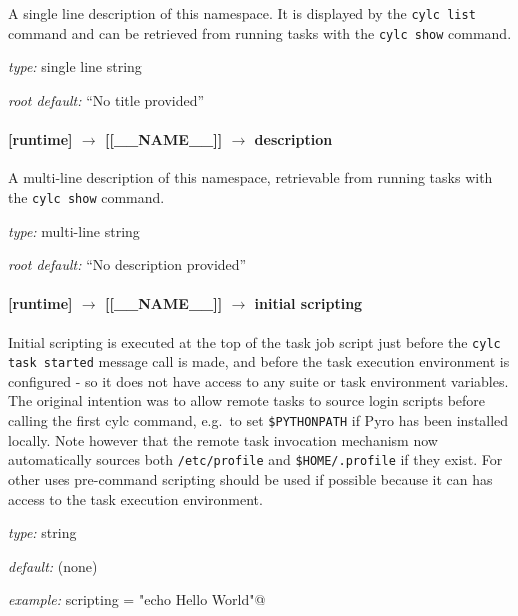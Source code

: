 A single line description of this namespace. It is displayed by the
\lstinline=cylc list= command and can be retrieved from running tasks
with the \lstinline=cylc show= command.

\begin{myitemize}
\item {\em type:} single line string 
\item {\em root default:} ``No title provided''
\end{myitemize}

\paragraph[description]{[runtime] $\rightarrow$ [[\_\_NAME\_\_]] $\rightarrow$ description}

A multi-line description of this namespace, retrievable from running tasks with the 
\lstinline=cylc show= command.

\begin{myitemize}
\item {\em type:} multi-line string 
\item {\em root default:} ``No description provided''
\end{myitemize}


\paragraph[initial scripting]{[runtime] $\rightarrow$ [[\_\_NAME\_\_]] $\rightarrow$ initial scripting}

Initial scripting is executed at the top of the task job script just
before the \lstinline=cylc task started= message call is made, and
before the task execution environment is configured - so it does not
have access to any suite or task environment variables.  The original
intention was to allow remote tasks to source login scripts before
calling the first cylc command, e.g.\ to set \lstinline=$PYTHONPATH= if
Pyro has been installed locally. Note however that the remote task
invocation mechanism now automatically sources both
\lstinline=/etc/profile= and \lstinline=$HOME/.profile= if they exist. 
For other uses pre-command scripting should be used if possible because
it can has access to the task execution environment.
\begin{myitemize}
\item {\em type:} string
\item {\em default:} (none)
\item {\em example:} \lstinline@initial scripting = "echo Hello World"@
\end{myitemize}

